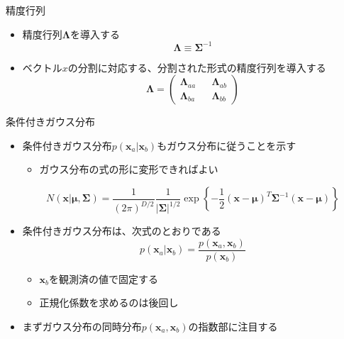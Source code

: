 \begin{frame}{精度行列}
 \begin{itemize}
  \item \alert{精度行列}$\bm{\Lambda}$を導入する
        \begin{equation}
         \bm{\Lambda} \equiv \bm{\Sigma}^{-1}
        \end{equation}

  \item ベクトル$x$の分割に対応する、分割された形式の精度行列を導入する
        \begin{equation}
         \bm{\Lambda}=
          \begin{pmatrix}
           \bm{\Lambda}_{aa} && \bm{\Lambda}_{ab}\\
           \bm{\Lambda}_{ba} && \bm{\Lambda}_{bb}
          \end{pmatrix}
        \end{equation}
 \end{itemize}
\end{frame}


\begin{frame}{条件付きガウス分布}
 \begin{itemize}
  \item 条件付きガウス分布$p(\bm{x}_a|\bm{x}_b)$もガウス分布に従うことを示す
        \begin{itemize}
         \item ガウス分布の式の形に変形できればよい
        \end{itemize}
        \begin{equation}
         N(\bm{x}|\bm{\mu},\bm{\Sigma}) = \frac{1}{(2\pi)^{D/2}}\frac{1}{|\bm{\Sigma}|^{1/2}}\exp\left\{-\frac{1}{2}(\bm{x} - \bm{\mu})^{T}\bm{\Sigma}^{-1}(\bm{x}-\bm{\mu})\right\}
        \end{equation}
  \item 条件付きガウス分布は、次式のとおりである
        \begin{equation}
         p(\bm{x}_a | \bm{x}_b) = \frac{p(\bm{x}_a, \bm{x}_b)}{p(\bm{x}_b)}
        \end{equation}
        \begin{itemize}
         \item $\bm{x}_b$を観測済の値で\alert{固定}する
         \item 正規化係数を求めるのは後回し
        \end{itemize}
  \item まずガウス分布の同時分布$p(\bm{x}_a,\bm{x}_b)$の指数部に注目する
 \end{itemize}
\end{frame}

